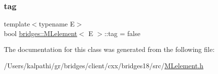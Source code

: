 \mbox{\label{classbridges_1_1_m_lelement_a0285a07355b2bc3d064c30e20aa2fd55}} 
\subsubsection{\texorpdfstring{tag}{tag}}
{\footnotesize\ttfamily template$<$typename E$>$ \\
bool \mbox{\hyperlink{classbridges_1_1_m_lelement}{bridges\+::\+M\+Lelement}}$<$ E $>$\+::tag = false\hspace{0.3cm}{\ttfamily [protected]}}



The documentation for this class was generated from the following file\+:\begin{DoxyCompactItemize}
\item 
/\+Users/kalpathi/gr/bridges/client/cxx/bridges18/src/\mbox{\hyperlink{_m_lelement_8h}{M\+Lelement.\+h}}\end{DoxyCompactItemize}
